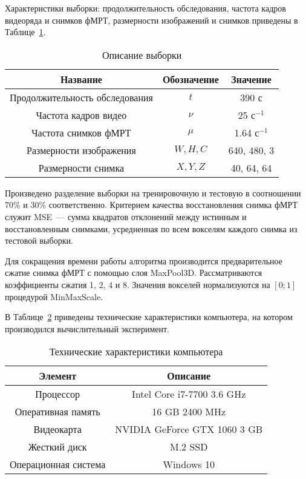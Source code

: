 \documentclass[a4paper, 12pt]{extarticle}
\begin{document}
Характеристики выборки: продолжительность обследования,
частота кадров видеоряда и снимков фМРТ, размерности изображений
и снимков приведены в Таблице~\ref{table:sample}.

\begin{table}[h!]
	\centering
	\caption{Описание выборки}
	\begin{tabular}{|c|c|c|}
		\hline
		Название                       & Обозначение & Значение             \\
		\hline \hline
		Продолжительность обследования & $t$         & 390 с                \\ \hline
		Частота кадров видео           & $\nu$       & 25 $\text{с}^{-1}$   \\ \hline
		Частота снимков фМРТ           & $\mu$       & 1.64 $\text{с}^{-1}$ \\ \hline
		Размерности изображения        & $W, H, C$   & 640, 480, 3          \\ \hline
		Размерности снимка             & $X, Y, Z$   & 40, 64, 64           \\ \hline
	\end{tabular}
	\label{table:sample}
\end{table}

Произведено разделение выборки на тренировочную и тестовую в соотношении 70\% и 30\% соответственно.
Критерием качества восстановления снимка фМРТ служит MSE~--- сумма квадратов отклонений
между истинным и восстановленным снимками, усредненная по всем вокселям каждого снимка
из тестовой выборки.

Для сокращения времени работы алгоритма производится предварительное сжатие снимка фМРТ
с помощью слоя MaxPool3D. Рассматриваются коэффициенты сжатия 1, 2, 4 и 8.
Значения вокселей нормализуются на $[0; 1]$ процедурой MinMaxScale.

В Таблице~\ref{table:pc} приведены технические характеристики компьютера, на котором
производился вычислительный эксперимент.

\begin{table}[h!]
	\centering
	\caption{Технические характеристики компьютера}
	\begin{tabular}{|c|c|}
		\hline
		Элемент & Описание \\
		\hline \hline
		Процессор & Intel Core i7-7700 3.6 GHz \\ \hline
		Оперативная память & 16 GB 2400 MHz \\ \hline
		Видеокарта & NVIDIA GeForce GTX 1060 3 GB \\ \hline
		Жесткий диск & M.2 SSD \\ \hline
		Операционная система & Windows 10 \\ \hline
	\end{tabular}
	\label{table:pc}
\end{table}
\end{document}
